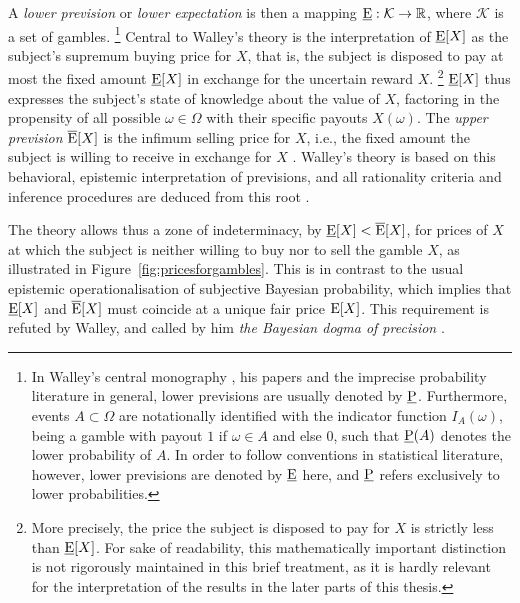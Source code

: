 A \emph{lower prevision} or \emph{lower expectation} is then a mapping
$\underline{\operatorname{E}}: \mathcal{K} \to \mathbb{R}$, where $\mathcal{K}$ is a set of gambles.%
\footnote{In Walley's central monography \parencite{1991:walley},
his papers and the imprecise probability literature in general,
lower previsions are usually denoted by $\underline{\operatorname{P}}$.
Furthermore, events $A \subset \Omega$ are notationally identified with the
indicator function $I_A(\omega)$, being a gamble with payout $1$ if $\omega \in A$ and else $0$,
such that $\underline{\operatorname{P}}(A)$ denotes the lower probability of $A$.
In order to follow conventions in statistical literature, however,
lower previsions are denoted by $\underline{\operatorname{E}}$ here,
and $\underline{\operatorname{P}}$ refers exclusively to lower probabilities.}
Central to Walley's theory is the interpretation of $\underline{\operatorname{E}}[X]$
as the subject's supremum buying price for $X$, that is,
the subject is disposed to pay at most the fixed amount $\underline{\operatorname{E}}[X]$
in exchange for the uncertain reward $X$.%
\footnote{More precisely, the price the subject is disposed to pay for $X$ is strictly less than $\underline{\operatorname{E}}[X]$.
For sake of readability,
this mathematically important distinction is not rigorously maintained in this brief treatment,
as it is hardly relevant for the interpretation of the results in the later parts of this thesis.}
$\underline{\operatorname{E}}[X]$ thus expresses the subject's state of knowledge about the value of $X$,
factoring in the propensity of all possible $\omega \in \Omega$
with their specific payouts $X(\omega)$.
The \emph{upper prevision} $\overline{\operatorname{E}}[X]$ is the infimum selling price for $X$,
i.e., the fixed amount the subject is willing to receive in exchange for $X$
\parencite[p.~9]{1996:walley::expert}.
Walley's theory is based on this behavioral, epistemic interpretation of previsions,
and all rationality criteria and inference procedures
are deduced from this root \parencite[p.~5]{1996:walley::expert}.

The theory allows thus a zone of indeterminacy, by $\underline{\operatorname{E}}[X] < \overline{\operatorname{E}}[X]$,
for prices of $X$ at which the subject is neither willing to buy nor to sell the gamble $X$,
as illustrated in Figure~\ref{fig:pricesforgambles}.
This is in contrast to the usual epistemic operationalisation of subjective Bayesian probability,
which implies that $\underline{\operatorname{E}}[X]$ and $\overline{\operatorname{E}}[X]$ must coincide at a unique fair price $\operatorname{E}[X]$.
This requirement is refuted by Walley, and called by him \emph{the Bayesian dogma of precision}
\parencite[\S 5]{1991:walley}.

